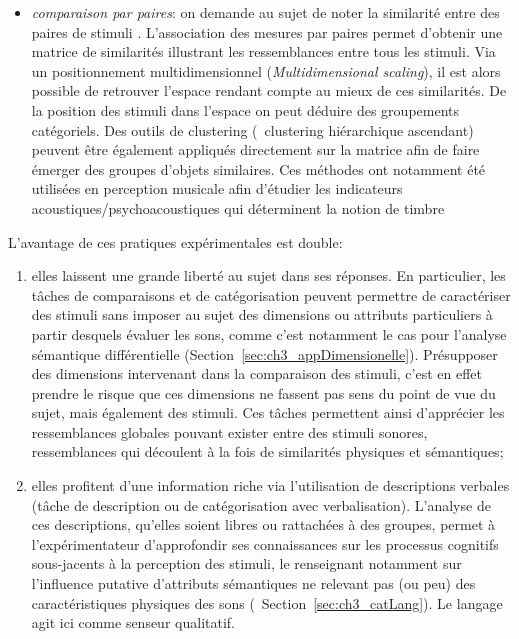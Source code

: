 \begin{itemize}
\item \emph{comparaison par paires}: on demande au sujet de noter la similarité entre des paires de stimuli \citep{gygi2007similarity}. L'association des mesures par paires permet d'obtenir une matrice de similarités illustrant les ressemblances entre tous les stimuli. Via un positionnement multidimensionnel (\emph{Multidimensional scaling}), il est alors possible de retrouver l'espace rendant compte au mieux de ces similarités. De la position des stimuli dans l'espace on peut déduire des groupements catégoriels. Des outils de clustering (\eg~clustering hiérarchique ascendant) peuvent être également appliqués directement sur la matrice afin de faire émerger des groupes d'objets similaires. Ces méthodes ont notamment été utilisées en perception musicale afin d'étudier les indicateurs acoustiques/psychoacoustiques qui déterminent la notion de timbre \citep{caclin2005acoustic}
\end{itemize}

L'avantage de ces pratiques expérimentales est double:

\begin{enumerate}

\item elles laissent une grande liberté au sujet dans ses réponses. En particulier, les tâches de comparaisons et de catégorisation peuvent permettre de caractériser des stimuli sans imposer au sujet des dimensions ou attributs particuliers à partir desquels évaluer les sons, comme c'est notamment le cas pour l'analyse sémantique différentielle (\cf Section~\ref{sec:ch3_appDimensionelle}). Présupposer des dimensions intervenant dans la comparaison des stimuli, c'est en effet prendre le risque que ces dimensions ne fassent pas sens du point de vue du sujet, mais également des stimuli. Ces tâches permettent ainsi d'apprécier les ressemblances globales pouvant exister entre des stimuli sonores, ressemblances qui découlent à la fois de similarités physiques et sémantiques;

\item elles profitent d'une information riche via l'utilisation de descriptions verbales (tâche de description ou de catégorisation avec verbalisation). L'analyse de ces descriptions, qu'elles soient libres ou rattachées à des groupes, permet à l'expérimentateur d’approfondir ses connaissances sur les processus cognitifs sous-jacents à la perception des stimuli, le renseignant notamment sur l'influence putative d'attributs sémantiques ne relevant pas (ou peu) des caractéristiques physiques des sons (\cf~Section~\ref{sec:ch3_catLang}). Le langage agit ici comme senseur qualitatif.

\end{enumerate}

